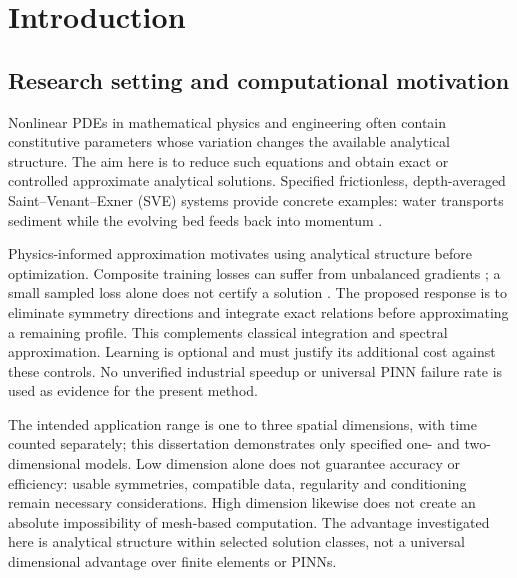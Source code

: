 \documentclass[12pt,a4paper,oneside]{report}
\numberwithin{equation}{chapter}
\theoremstyle{remark}\newtheorem{remark}[theorem]{Remark}
\begin{document}
\clearpage
{}
\chapter{Introduction}\label{ch:introduction}
\section{Research setting and computational motivation}
Nonlinear PDEs in mathematical physics and engineering often contain
constitutive parameters whose variation changes the available analytical
structure. The aim here is to reduce such equations and obtain exact or
controlled approximate analytical solutions. Specified frictionless,
depth-averaged Saint--Venant--Exner (SVE) systems provide concrete examples:
water transports sediment while the evolving bed feeds back into momentum
\cite{exner1925,fernandez2017}.

Physics-informed approximation motivates using analytical structure before
optimization. Composite training losses can suffer from unbalanced gradients
\cite{wang2020}; a small sampled loss alone does not certify a solution
\cite{mishra2023}. The proposed response is to eliminate symmetry directions
and integrate exact relations before approximating a remaining profile.
This complements classical integration and spectral approximation. Learning
is optional and must justify its additional cost against these controls.
No unverified industrial speedup or universal PINN failure rate is used as
evidence for the present method.

The intended application range is one to three spatial dimensions, with
time counted separately; this dissertation demonstrates only specified
one- and two-dimensional models. Low dimension alone does not guarantee
accuracy or efficiency: usable symmetries, compatible data, regularity and
conditioning remain necessary considerations. High dimension likewise does
not create an absolute impossibility of mesh-based computation. The
advantage investigated here is analytical structure within selected solution
classes, not a universal dimensional advantage over finite elements or PINNs.
\end{document}
